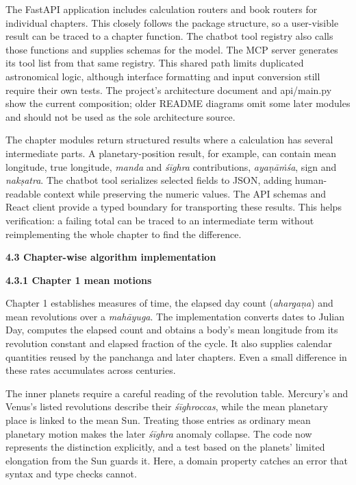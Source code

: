 \documentclass[
]{article}
\begin{document}
The FastAPI application includes calculation routers and book routers
for individual chapters. This closely follows the package structure, so
a user-visible result can be traced to a chapter function. The chatbot
tool registry also calls those functions and supplies schemas for the
model. The MCP server generates its tool list from that same registry.
This shared path limits duplicated astronomical logic, although
interface formatting and input conversion still require their own tests.
The project's architecture document and api/main.py show the current
composition; older README diagrams omit some later modules and should
not be used as the sole architecture source.

The chapter modules return structured results where a calculation has
several intermediate parts. A planetary-position result, for example,
can contain mean longitude, true longitude, \emph{manda} and
\emph{śīghra} contributions, \emph{ayaṇāṁśa}, sign and \emph{nakṣatra}.
The chatbot tool serializes selected fields to JSON, adding
human-readable context while preserving the numeric values. The API
schemas and React client provide a typed boundary for transporting these
results. This helps verification: a failing total can be traced to an
intermediate term without reimplementing the whole chapter to find the
difference.

\textbf{4.3 Chapter-wise algorithm implementation}

\textbf{4.3.1 Chapter 1 mean motions}

Chapter 1 establishes measures of time, the elapsed day count
(\emph{ahargaṇa}) and mean revolutions over a \emph{mahāyuga}. The
implementation converts dates to Julian Day, computes the elapsed count
and obtains a body's mean longitude from its revolution constant and
elapsed fraction of the cycle. It also supplies calendar quantities
reused by the panchanga and later chapters. Even a small difference in
these rates accumulates across centuries.

The inner planets require a careful reading of the revolution table.
Mercury's and Venus's listed revolutions describe their
\emph{śīghroccas}, while the mean planetary place is linked to the mean
Sun. Treating those entries as ordinary mean planetary motion makes the
later \emph{śīghra} anomaly collapse. The code now represents the
distinction explicitly, and a test based on the planets' limited
elongation from the Sun guards it. Here, a domain property catches an
error that syntax and type checks cannot.
\end{document}
